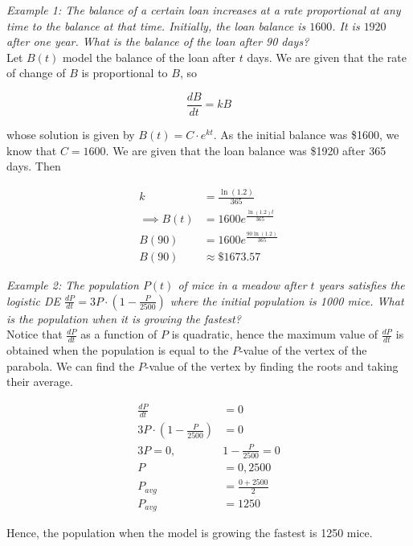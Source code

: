         \noindent \color{blue} \textit{Example 1: The balance of a certain loan increases at a
        rate proportional at any time to the balance at that time. Initially, the loan balance
        is $1600$. It is $1920$ after one year. What is the balance of the loan after 90 days?}
        \color{black} \\

        \noindent Let $B(t)$ model the balance of the loan after $t$ days. We are given that
        the rate of change of $B$ is proportional to $B$, so

        \begin{equation*}
            \frac{dB}{dt} = kB
        \end{equation*}

        \noindent whose solution is given by $B(t) = C\cdot e^{kt}$. As the initial balance was
        \$1600, we know that $C=1600$. We are given that the loan balance was \$1920 after 365
        days. Then

        \begin{align*}
            k               &= \frac{\ln{(1.2)}}{365} \\
            \implies B(t)   &= 1600e^{\frac{\ln{(1.2)}t}{365}} \\
            B(90)           &= 1600e^{\frac{90\ln{(1.2)}}{365}} \\
            B(90)           &\approx \$ 1673.57
        \end{align*}

        \pagebreak
        \noindent \color{blue} \textit{Example 2: The population $P(t)$ of mice in a meadow
        after $t$ years satisfies the logistic DE $\frac{dP}{dt}=3P\cdot
        \left(1-\frac{P}{2500}\right)$ where the initial population is 1000 mice. What is the
        population when it is growing the fastest?} \color{black} \\

        \noindent Notice that $\frac{dP}{dt}$ as a function of $P$ is quadratic, hence the
        maximum value of $\frac{dP}{dt}$ is obtained when the population is equal to the $P$-value
        of the vertex of the parabola. We can find the $P$-value of the vertex by finding the
        roots and taking their average.

        \begin{align*}
            \frac{dP}{dt}                           &= 0 \\
            3P\cdot\left(1-\frac{P}{2500}\right)    &= 0 \\
            3P=0,                                   &  1-\frac{P}{2500} = 0 \\
            P                                       &= 0,2500 \\
            P_{avg}                                 &= \frac{0+2500}{2} \\
            P_{avg}                                 &= 1250
        \end{align*}

        \noindent Hence, the population when the model is growing the fastest is 1250 mice.